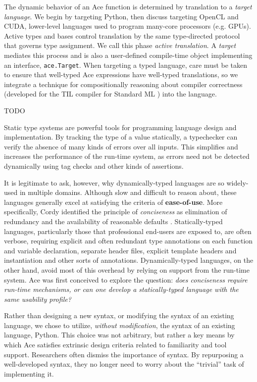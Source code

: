 \documentclass[10pt,preprint]{sigplanconf}
\begin{document}
{The dynamic behavior of an Ace function is determined by translation to a \emph{target language}. We begin by  targeting Python, then discuss targeting OpenCL and CUDA, lower-level languages used to program many-core processors (e.g. GPUs). Active types and bases control translation by the same type-directed protocol that governs type assignment. We call this phase \emph{active translation}. A \emph{target} mediates this process and is also a user-defined compile-time object implementing an interface, \verb|ace.Target|. 
When targeting a typed language, care must be taken to ensure that well-typed Ace expressions have well-typed translations, so we integrate a technique for compositionally reasoning about compiler correctness (developed for the TIL compiler for Standard ML \cite{tarditi+:til-OLD}) into the language.

TODO

Static type systems are powerful tools for programming language design and implementation. By tracking the type of a value statically, a typechecker can verify the absence of many kinds of errors over all inputs. This simplifies and increases the performance of the run-time system, as errors need not be detected dynamically using tag checks and other kinds of assertions.

It is legitimate to ask, however, why dynamically-typed languages are so widely-used in multiple domains. Although slow and difficult to reason about, these languages generally excel at satisfying the criteria of \textbf{ease-of-use}. More specifically, Cordy identified the principle of \emph{conciseness} as elimination of
redundancy and the availability of reasonable defaults \cite{cordy1992hints}. Statically-typed languages, particularly those that professional end-users are exposed to, are often verbose, requiring explicit and often redundant type annotations on each function and variable declaration, separate header files, explicit template headers and  instantiation and other sorts of annotations.  Dynamically-typed languages, on the other hand, avoid most of this overhead by relying on support from the run-time system. Ace was first conceived to explore the question: \emph{does conciseness require run-time mechanisms, or can one develop a statically-typed language with the same usability profile?}


Rather than designing a new syntax, or modifying the syntax of an existing language, we chose to utilize, \emph{without modification}, the syntax of an existing language, Python. This choice was not arbitrary, but rather a key means by which Ace satisfies extrinsic design criteria related to familiarity and tool support. Researchers often dismiss the importance of syntax. By repurposing a well-developed syntax, they no longer need to worry about the ``trivial'' task of implementing it.

}
\end{document}
